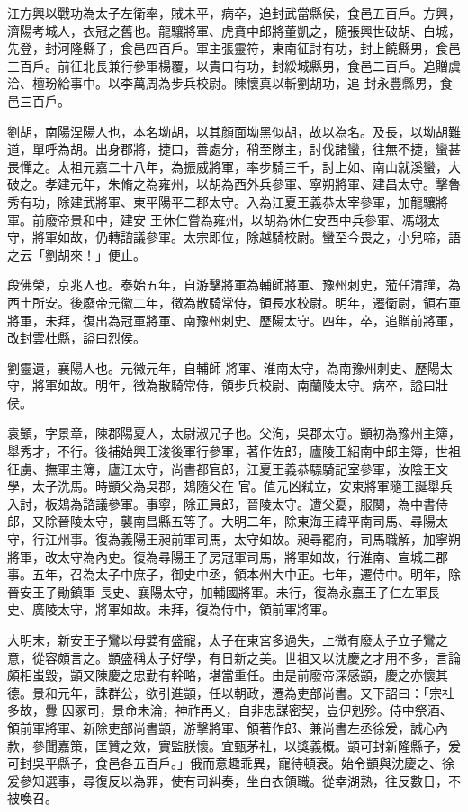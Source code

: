 \begin{pinyinscope}
 江方興以戰功為太子左衛率，賊未平，病卒，追封武當縣侯，食邑五百戶。方興，濟陽考城人，衣冠之舊也。龍驤將軍、虎賁中郎將董凱之，隨張興世破胡、白城，先登，封河隆縣子，食邑四百戶。軍主張靈符，東南征討有功，封上饒縣男，食邑三百戶。前征北長兼行參軍楊覆，以貴口有功，封綏城縣男，食邑二百戶。追贈虞洽、檀玢給事中。以李萬周為步兵校尉。陳懷真以斬劉胡功，追
 封永豐縣男，食邑三百戶。



 劉胡，南陽涅陽人也，本名坳胡，以其顏面坳黑似胡，故以為名。及長，以坳胡難道，單呼為胡。出身郡將，捷口，善處分，稍至隊主，討伐諸蠻，往無不捷，蠻甚畏憚之。太祖元嘉二十八年，為振威將軍，率步騎三千，討上如、南山就溪蠻，大破之。孝建元年，朱脩之為雍州，以胡為西外兵參軍、寧朔將軍、建昌太守。擊魯秀有功，除建武將軍、東平陽平二郡太守。入為江夏王義恭太宰參軍，加龍驤將軍。前廢帝景和中，建安
 王休仁嘗為雍州，以胡為休仁安西中兵參軍、馮翊太守，將軍如故，仍轉諮議參軍。太宗即位，除越騎校尉。蠻至今畏之，小兒啼，語之云「劉胡來！」便止。



 段佛榮，京兆人也。泰始五年，自游擊將軍為輔師將軍、豫州刺史，蒞任清謹，為西土所安。後廢帝元徽二年，徵為散騎常侍，領長水校尉。明年，遷衛尉，領右軍將軍，未拜，復出為冠軍將軍、南豫州刺史、歷陽太守。四年，卒，追贈前將軍，改封雲杜縣，謚曰烈侯。



 劉靈遺，襄陽人也。元徽元年，自輔師
 將軍、淮南太守，為南豫州刺史、歷陽太守，將軍如故。明年，徵為散騎常侍，領步兵校尉、南蘭陵太守。病卒，謚曰壯侯。



 袁顗，字景章，陳郡陽夏人，太尉淑兄子也。父洵，吳郡太守。顗初為豫州主簿，舉秀才，不行。後補始興王浚後軍行參軍，著作佐郎，廬陵王紹南中郎主簿，世祖征虜、撫軍主簿，廬江太守，尚書都官郎，江夏王義恭驃騎記室參軍，汝陰王文學，太子洗馬。時顗父為吳郡，鳷隨父在
 官。值元凶弒立，安東將軍隨王誕舉兵入討，板鳷為諮議參軍。事寧，除正員郎，晉陵太守。遭父憂，服闋，為中書侍郎，又除晉陵太守，襲南昌縣五等子。大明二年，除東海王禕平南司馬、尋陽太守，行江州事。復為義陽王昶前軍司馬，太守如故。昶尋罷府，司馬職解，加寧朔將軍，改太守為內史。復為尋陽王子房冠軍司馬，將軍如故，行淮南、宣城二郡事。五年，召為太子中庶子，御史中丞，領本州大中正。七年，遷侍中。明年，除晉安王子勛鎮軍
 長史、襄陽太守，加輔國將軍。未行，復為永嘉王子仁左軍長史、廣陵太守，將軍如故。未拜，復為侍中，領前軍將軍。



 大明末，新安王子鸞以母嬖有盛寵，太子在東宮多過失，上微有廢太子立子鸞之意，從容頗言之。顗盛稱太子好學，有日新之美。世祖又以沈慶之才用不多，言論頗相蚩毀，顗又陳慶之忠勤有幹略，堪當重任。由是前廢帝深感顗，慶之亦懷其德。景和元年，誅群公，欲引進顗，任以朝政，遷為吏部尚書。又下詔曰：「宗社多故，釁
 因冢司，景命未淪，神祚再乂，自非忠謀密契，豈伊剋殄。侍中祭酒、領前軍將軍、新除吏部尚書顗，游擊將軍、領著作郎、兼尚書左丞徐爰，誠心內款，參聞嘉策，匡贊之效，實監朕懷。宜甄茅社，以獎義概。顗可封新隆縣子，爰可封吳平縣子，食邑各五百戶。」俄而意趣乖異，寵待頓衰。始令顗與沈慶之、徐爰參知選事，尋復反以為罪，使有司糾奏，坐白衣領職。從幸湖熟，往反數日，不被喚召。




\end{pinyinscope}

